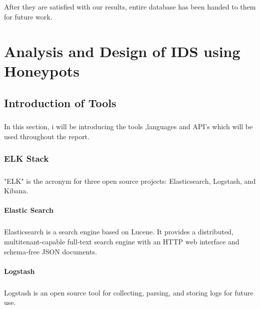 \documentclass{report}
\begin{document}
\paragraph{}
After they are satisfied with our results, entire database has been handed to them for future work.


\chapter{Analysis and Design of IDS using Honeypots}

\section{Introduction of Tools}

\paragraph{}
In this section, i will be introducing the tools ,languages and API's which will be used throughout the report.

\subsection{ELK Stack}
\paragraph{}
"ELK" is the acronym for three open source projects: Elasticsearch, Logstash, and Kibana.

\subsubsection{Elastic Search}

\paragraph{}
Elasticsearch is a search engine based on Lucene. It provides a distributed, multitenant-capable full-text search engine with an HTTP web interface and schema-free JSON documents.

\subsubsection{Logstash}

\paragraph{}
Logstash is an open source tool for collecting, parsing, and storing logs for future use.
\end{document}
